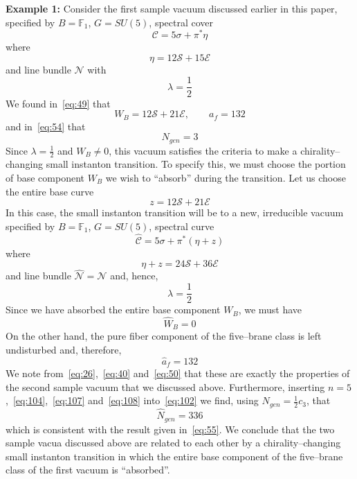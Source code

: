 \documentclass[a4paper,12pt]{article}
\numberwithin{equation}{section}
\def\cC{{\mathcal C}}
\def\cE{{\mathcal E}}
\def\cN{{\mathcal N}}
\def\cS{{\mathcal S}}
\theoremstyle{plain}
\begin{document}
\noindent
{\bf Example 1:}
Consider the first sample vacuum discussed earlier in this paper, specified by
$B={\mathbb F}_{1}$, $G=SU(5)$, spectral cover
\begin{equation}
\cC=5\sigma+\pi^{*}\eta
\label{eq:103}
\end{equation}
where
\begin{equation}
\eta=12\cS+15\cE
\label{eq:104}
\end{equation}
and line bundle $\cN$ with
\begin{equation}
\lambda=\frac{1}{2}
\label{eq:105}
\end{equation}
We found in~\eqref{eq:49} that
\begin{equation}
W_{B}=12\cS+21\cE, \qquad a_{f}=132
\label{eq:106}
\end{equation}
and in~\eqref{eq:54} that 
\begin{equation}
N_{gen}=3
\label{eq:107}
\end{equation}
Since $\lambda=\frac{1}{2}$ and $W_{B} \neq 0$, this vacuum satisfies the
criteria to make a chirality--changing small instanton transition. To specify
this, we must choose the portion of base component $W_{B}$ we wish to
``absorb'' during the transition. Let us choose the entire base curve
\begin{equation}
z=12\cS+21\cE
\label{eq:108}
\end{equation}
In this case, the small instanton transition will be to a new, irreducible
vacuum specified by $B={\mathbb F}_{1}$, $G=SU(5)$, spectral curve
\begin{equation}
\widehat{\cC}=5\sigma+\pi^{*}(\eta+ z)
\label{eq:109}
\end{equation}
where
\begin{equation}
\eta+ z=24\cS+36\cE
\label{eq:110}
\end{equation}
and line bundle $\widehat{\cN}=\cN$ and, hence,
\begin{equation}
\lambda=\frac{1}{2}
\label{eq:111}
\end{equation}
Since we have absorbed the entire base component $W_{B}$, we must have
\begin{equation}
\hat{W}_{B}=0
\label{eq:112}
\end{equation}
On the other hand, the pure fiber component of the five--brane class is left
undisturbed and, therefore,
\begin{equation}
\hat{a}_{f}=132
\label{eq:113}
\end{equation}
We note from~\eqref{eq:26},~\eqref{eq:40} and~\eqref{eq:50} 
that these are exactly the properties of the second sample vacuum that
we discussed above. Furthermore, inserting
$n=5$,~\eqref{eq:104},~\eqref{eq:107} and~\eqref{eq:108} into~\eqref{eq:102} we
find, using $N_{gen}=\frac{1}{2}c_{3}$, that
\begin{equation}
\hat{N}_{gen}=336
\label{eq:114}
\end{equation}
which is consistent with the result given in~\eqref{eq:55}. We conclude that
the two sample vacua discussed above are related to each other by a
chirality--changing small instanton transition in which the entire base
component of the five--brane class of the first vacuum is ``absorbed''.
\end{document}
